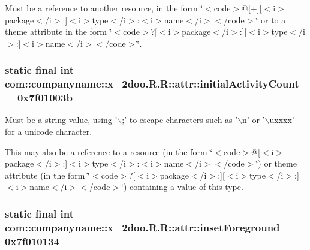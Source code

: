 Must be a reference to another resource, in the form \char`\"{}$<$code$>$@\mbox{[}+\mbox{]}\mbox{[}$<$i$>$package$<$/i$>$:\mbox{]}$<$i$>$type$<$/i$>$:$<$i$>$name$<$/i$>$$<$/code$>$\char`\"{} or to a theme attribute in the form \char`\"{}$<$code$>$?\mbox{[}$<$i$>$package$<$/i$>$:\mbox{]}\mbox{[}$<$i$>$type$<$/i$>$:\mbox{]}$<$i$>$name$<$/i$>$$<$/code$>$\char`\"{}. \hypertarget{classcom_1_1companyname_1_1x__2doo_1_1_r_1_1attr_b456a9292f255170ddf6c1a681d696f1}{
\subsubsection[{initialActivityCount}]{\setlength{\rightskip}{0pt plus 5cm}static final int com::companyname::x\_\-2doo.R.R::attr::initialActivityCount = 0x7f01003b}}
\label{classcom_1_1companyname_1_1x__2doo_1_1_r_1_1attr_b456a9292f255170ddf6c1a681d696f1}


Must be a \hyperlink{classcom_1_1companyname_1_1x__2doo_1_1_r_1_1string}{string} value, using '$\backslash$;' to escape characters such as '$\backslash$n' or '$\backslash$uxxxx' for a unicode character. 

This may also be a reference to a resource (in the form \char`\"{}$<$code$>$@\mbox{[}$<$i$>$package$<$/i$>$:\mbox{]}$<$i$>$type$<$/i$>$:$<$i$>$name$<$/i$>$$<$/code$>$\char`\"{}) or theme attribute (in the form \char`\"{}$<$code$>$?\mbox{[}$<$i$>$package$<$/i$>$:\mbox{]}\mbox{[}$<$i$>$type$<$/i$>$:\mbox{]}$<$i$>$name$<$/i$>$$<$/code$>$\char`\"{}) containing a value of this type. \hypertarget{classcom_1_1companyname_1_1x__2doo_1_1_r_1_1attr_9976e4f036961102fa43ccc9a6fa760e}{
\subsubsection[{insetForeground}]{\setlength{\rightskip}{0pt plus 5cm}static final int com::companyname::x\_\-2doo.R.R::attr::insetForeground = 0x7f010134}}
\label{classcom_1_1companyname_1_1x__2doo_1_1_r_1_1attr_9976e4f036961102fa43ccc9a6fa760e}



